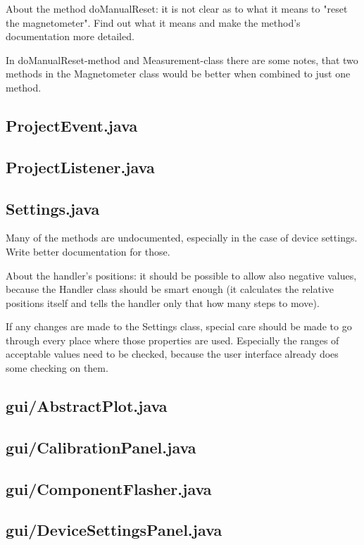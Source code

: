 About the method doManualReset: it is not clear as to what it means to "reset the magnetometer". Find out what it means and make the method's documentation more detailed.

In doManualReset-method and Measurement-class there are some notes, that two methods in the Magnetometer class would be better when combined to just one method.


\subsection{ProjectEvent.java}

\subsection{ProjectListener.java}

\subsection{Settings.java}

Many of the methods are undocumented, especially in the case of device settings. Write better documentation for those.

About the handler's positions: it should be possible to allow also negative values, because the Handler class should be smart enough (it calculates the relative positions itself and tells the handler only that how many steps to move).

If any changes are made to the Settings class, special care should be made to go through every place where those properties are used. Especially the ranges of acceptable values need to be checked, because the user interface already does some checking on them.


\subsection{gui/AbstractPlot.java}

\subsection{gui/CalibrationPanel.java}

\subsection{gui/ComponentFlasher.java}

\subsection{gui/DeviceSettingsPanel.java}


